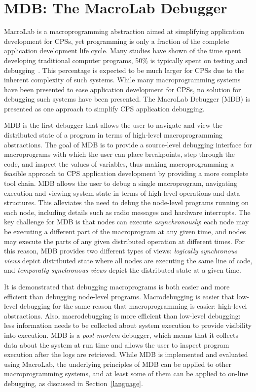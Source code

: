 \chapter{MDB: The MacroLab Debugger}
\label{sect:mdb}

MacroLab is a macroprogramming abstraction aimed at simplifying application
development for CPSs, yet programming is only a fraction of the complete
application development life cycle. Many studies have shown of the time spent
developing traditional computer programs, 50\% is typically spent on testing and
debugging~\cite{zeller2009programs}. This percentage is expected to be much
larger for CPSs due to the inherent complexity of such systems. While many
macroprogramming systems have been presented to ease application development for
CPSs, no solution for debugging such systems have been presented. The MacroLab
Debugger (MDB) is presented as one approach to simplify CPS application
debugging.

MDB is the first debugger that allows the user to navigate and view the
distributed state of a program in terms of high-level macroprogramming
abstractions. The goal of MDB is to provide a source-level debugging interface
for macroprograms with which the user can place breakpoints, step through the
code, and inspect the values of variables, thus making macroprogramming a
feasible approach to CPS application development by providing a more complete
tool chain.  MDB allows the user to debug a single macroprogram, navigating
execution and viewing system state in terms of high-level operations and data
structures.  This alleviates the need to debug the node-level programs running
on each node, including details such as radio messages and hardware interrupts.
The key challenge for MDB is that nodes can execute \emph{asynchronously}: each
node may be executing a different part of the macroprogram at any given time,
and nodes may execute the parts of any given distributed operation at different
times.  For this reason, MDB provides two different types of views:
\emph{logically synchronous views} depict distributed state where all nodes are
executing the same line of code, and \emph{temporally synchronous views} depict
the distributed state at a given time.

It is demonstrated that debugging macroprograms is both easier and more
efficient than debugging node-level programs. Macrodebugging is easier that
low-level debugging for the same reason that macroprogramming is easier:
high-level abstractions. Also, macrodebugging is more efficient than low-level
debugging: less information needs to be collected about system execution to
provide visibility into execution. MDB is a \emph{post-mortem} debugger, which
means that it collects data about the system at run time and allows the user to
inspect program execution after the logs are retrieved. While MDB is implemented
and evaluated using MacroLab, the underlying principles of MDB can be applied to
other macroprogramming systems, and at least some of them can be applied to
on-line debugging, as discussed in Section~\ref{language}.

